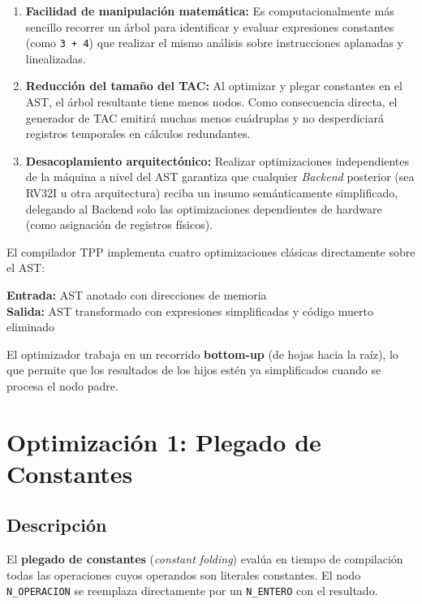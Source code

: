 \begin{enumerate}
    \item \textbf{Facilidad de manipulación matemática:} Es computacionalmente más sencillo recorrer un árbol para identificar y evaluar expresiones constantes (como \texttt{3 + 4}) que realizar el mismo análisis sobre instrucciones aplanadas y linealizadas.
    \item \textbf{Reducción del tamaño del TAC:} Al optimizar y plegar constantes en el AST, el árbol resultante tiene menos nodos. Como consecuencia directa, el generador de TAC emitirá muchas menos cuádruplas y no desperdiciará registros temporales en cálculos redundantes.
    \item \textbf{Desacoplamiento arquitectónico:} Realizar optimizaciones independientes de la máquina a nivel del AST garantiza que cualquier \textit{Backend} posterior (sea RV32I u otra arquitectura) reciba un insumo semánticamente simplificado, delegando al Backend solo las optimizaciones dependientes de hardware (como asignación de registros físicos).
\end{enumerate}

El compilador TPP implementa cuatro optimizaciones clásicas directamente sobre el AST:

\begin{infobox}
\textbf{Entrada:} AST anotado con direcciones de memoria \\
\textbf{Salida:} AST transformado con expresiones simplificadas y código muerto eliminado
\end{infobox}

El optimizador trabaja en un recorrido \textbf{bottom-up} (de hojas hacia la raíz), lo que permite que los resultados de los hijos estén ya simplificados cuando se procesa el nodo padre.

\section{Optimización 1: Plegado de Constantes}

\subsection{Descripción}

El \textbf{plegado de constantes} (\textit{constant folding}) evalúa en tiempo de compilación todas las operaciones cuyos operandos son literales constantes. El nodo \texttt{N\_OPERACION} se reemplaza directamente por un \texttt{N\_ENTERO} con el resultado.

